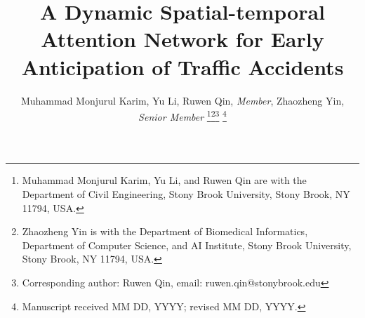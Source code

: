 \documentclass[journal]{IEEEtran}
\begin{document}
\title{A Dynamic Spatial-temporal Attention Network for Early Anticipation of Traffic Accidents}




\author{Muhammad Monjurul Karim,
        Yu Li,
        Ruwen Qin, {\it Member},
        Zhaozheng Yin, {\it Senior Member}
\thanks{Muhammad Monjurul Karim, Yu Li, and Ruwen Qin are with the Department
of Civil Engineering,  Stony  Brook  University, Stony Brook, NY 11794, USA.}\thanks{Zhaozheng Yin is with the Department of Biomedical Informatics, Department of Computer Science, and AI Institute, Stony Brook University, Stony Brook, NY 11794, USA.}\thanks{ Corresponding author: Ruwen Qin, email: ruwen.qin@stonybrook.edu}
\thanks{Manuscript received MM DD, YYYY; revised MM DD, YYYY.}}



















\maketitle
\end{document}
